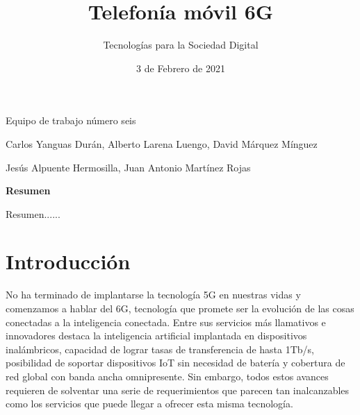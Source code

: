  

 

\graphicspath{{../Book/figures/}}


\title{Telefonía móvil 6G}
\date{3 de Febrero de 2021}            
\author{Tecnologías para la Sociedad Digital}




\maketitle
\begin{description}                             
  {        
  \item[Título en inglés:] \mybooktitleenglish   
  }                                            
  {                                           
  }                                              
\item[Equipo:] Equipo de trabajo número seis     
\item[Autores:] Carlos Yanguas Durán, Alberto Larena Luengo, David Márquez Mínguez                
\item[\expandafter\makefirstuc\expandafter{\mybookTutorOrTutores}:] Jesús Alpuente Hermosilla, Juan Antonio Martínez Rojas          
\end{description}   

\begin{center}
 {\bfseries \Large Resumen}
\end{center}

Resumen......                                    

\section{Introducción}
\label{sec:introduccion}

No ha terminado de implantarse la tecnología 5G en nuestras  vidas y comenzamos a hablar del 6G, tecnología que promete ser la evolución de las cosas conectadas a la inteligencia conectada. Entre sus servicios más llamativos e innovadores destaca la inteligencia artificial implantada en dispositivos inalámbricos, capacidad de lograr tasas de transferencia de hasta 1Tb/s, posibilidad de soportar dispositivos IoT sin necesidad de batería y cobertura de red global con banda ancha omnipresente. Sin embargo, todos estos avances requieren de solventar una serie de requerimientos que parecen tan inalcanzables como los servicios que puede llegar a ofrecer esta misma tecnología. 

